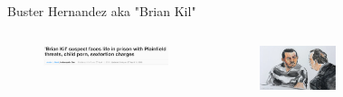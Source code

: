\documentclass[nobackground,dvipsnames,table]{beamer}
\begin{document}
\begin{frame}{Buster Hernandez aka "Brian Kil"}
    \begin{columns}
            \begin{figure}
                \centering
                \includegraphics[width=\textwidth]{brian-kil-headline}
            \end{figure}

            \begin{figure}
                \centering
                \includegraphics[width=\textwidth]{brian-kil-sketch}
            \end{figure}
            \begin{figure}
                \centering

\end{figure}
\end{columns}
\end{frame}
\end{document}
